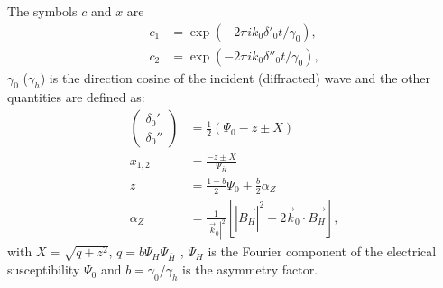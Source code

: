 \documentclass[preprint]{iucr}              %
\begin{document}
The symbols $c$ and $x$ are
\begin{subequations}
\begin{align}
c_1 &=\exp(-2\pi i  k_0 \delta'_0 t /\gamma_0), 
 \nonumber \\
 c_2 &=\exp(-2\pi i  k_0 \delta''_0 t /\gamma_0), 
\end{align}
\end{subequations}
$\gamma_0$ ($\gamma_h$) is the direction cosine of the incident (diffracted) 
wave and the other quantities are defined as:
\begin{subequations}
\begin{align}
	\left( \begin{array}{ll}
               \delta_0' \nonumber \\
               \delta_0''
	       \end{array} 
	\right)
	&= \frac{1}{2} \left( \Psi_0 - z\pm X \right)
\nonumber \\
    x_{1,2}
	&= \frac{- z\pm X}{\Psi_{\bar{H}}}
 \nonumber \\
	z &= \frac{1-b}{2} \Psi_0 + \frac{b}{2} \alpha_Z 
 \nonumber \\
	\alpha_Z &= \frac{1}{|\vec{k}_0|^2} 
              \left[ |\vec{B_H}|^2 +
	       2 \vec{k}_0 \cdot \vec{B_H} \right], \nonumber
\end{align}
\end{subequations}
with $X=\sqrt{q+z^2}$, $q=b\Psi_H\Psi_{\bar{H}}$ , 
$\Psi_H$ is the Fourier component of the
electrical susceptibility $\Psi_0$ and $b=\gamma_0/\gamma_h$ is the asymmetry
factor.
\end{document}
